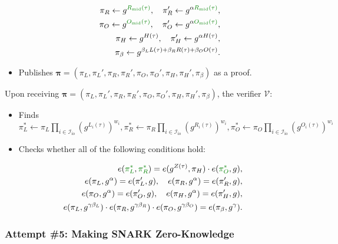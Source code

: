 \documentclass[../lecture-notes-148x210.tex]{subfiles}
\begin{document}
\begin{tcolorbox}
\begin{itemize}[label=]
\begin{align*}
            \pi_R \gets g^{\textcolor{green!50!black}{R_{\text{mid}}(\tau)}}, \quad \pi_R' \gets g^{\alpha \textcolor{green!50!black}{R_{\text{mid}}(\tau)}}, \\
            \pi_O \gets g^{\textcolor{green!50!black}{O_{\text{mid}}(\tau)}}, \quad \pi_O' \gets g^{\alpha \textcolor{green!50!black}{O_{\text{mid}}(\tau)}}, \\
            \pi_H \gets g^{H(\tau)}, \quad \pi_H' \gets g^{\alpha H(\tau)}, \\
            \pi_{\beta} \gets g^{\beta_LL(\tau) + \beta_RR(\tau) + \beta_OO(\tau)}.
        \end{align*}
        \item Publishes $\boldsymbol{\pi} = (\pi_L,\pi_L',\pi_R,\pi_R',\pi_O,\pi_O',\pi_H,\pi_H',\pi_{\beta})$ as a proof.
    \end{itemize}

    \newpage
    Upon receiving $\boldsymbol{\pi} = (\pi_L,\pi_L',\pi_R,\pi_R',\pi_O,\pi_O',\pi_H,\pi_H',\pi_{\beta})$, the verifier $\mathcal{V}$:
    \begin{itemize}[label=]
        \item \textcolor{green!50!black}{Finds $\pi_L^* \gets \pi_L\prod_{i \in \mathcal{I}_{\text{io}}} (g^{L_i(\tau)})^{w_i},\pi_R^* \gets \pi_R\prod_{i \in \mathcal{I}_{\text{io}}} (g^{R_i(\tau)})^{w_i},\pi_O^* \gets \pi_O\prod_{i \in \mathcal{I}_{\text{io}}} (g^{O_i(\tau)})^{w_i}$}
        \item Checks whether all of the following conditions hold:
    \end{itemize}
    \begin{align*}
        e(\textcolor{green!50!black}{\pi_L^*}, \textcolor{green!50!black}{\pi_R^*}) = e(g^{Z(\tau)}, \pi_H) \cdot e(\textcolor{green!50!black}{\pi_O^*}, g), \\
        e(\pi_L, g^{\alpha}) = e(\pi_L', g), \quad e(\pi_R, g^{\alpha}) = e(\pi_R', g), \\
        e(\pi_O, g^{\alpha}) = e(\pi_O', g), \quad e(\pi_H, g^{\alpha}) = e(\pi_H', g), \\
        e(\pi_L, g^{\gamma\beta_L}) \cdot e(\pi_R, g^{\gamma\beta_R}) \cdot e(\pi_O, g^{\gamma\beta_O}) = e(\pi_{\beta}, g^{\gamma}).
    \end{align*}
\end{tcolorbox}

\subsubsection{Attempt \#5: Making SNARK Zero-Knowledge}
\end{document}
